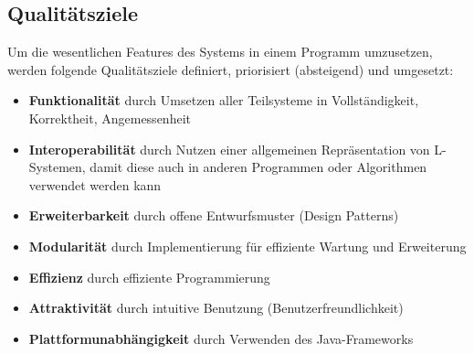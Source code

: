 \subsection*{Qualitätsziele}
Um die wesentlichen Features des Systems in einem Programm umzusetzen, werden folgende Qualitätsziele definiert,
priorisiert (absteigend) und umgesetzt:
\begin{itemize}
    \item \textbf{Funktionalität} durch Umsetzen aller Teilsysteme in Vollständigkeit, Korrektheit, Angemessenheit
    \item \textbf{Interoperabilität} durch Nutzen einer allgemeinen Repräsentation von L-Systemen, damit diese
    auch in anderen Programmen oder Algorithmen verwendet werden kann
    \item \textbf{Erweiterbarkeit} durch offene Entwurfsmuster (Design Patterns)
    \item \textbf{Modularität} durch Implementierung für effiziente Wartung und Erweiterung
    \item \textbf{Effizienz} durch effiziente Programmierung
    \item \textbf{Attraktivität} durch intuitive Benutzung (Benutzerfreundlichkeit)
    \item \textbf{Plattformunabhängigkeit} durch Verwenden des Java-Frameworks
\end{itemize}

\newpage


